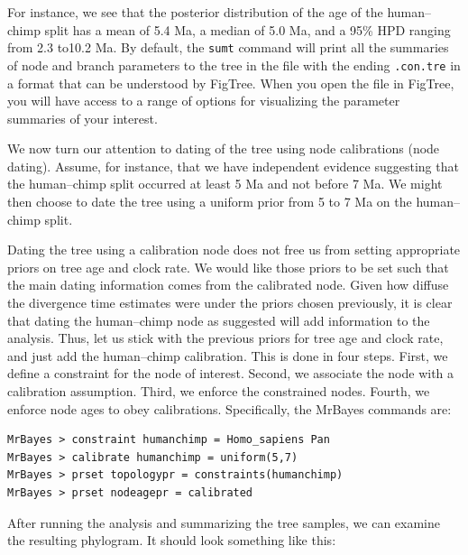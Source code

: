 \documentclass[12pt]{book}
\newcommand{\ttt}[1]{\texttt{#1} }
\begin{document}
For instance, we see that the posterior distribution of the age of the human--chimp split has a mean of 5.4 Ma, a
median of 5.0 Ma, and a 95\% HPD ranging from 2.3 to10.2 Ma. By default, the \ttt{sumt} command will print all
the summaries of node and branch parameters to the tree in the file with the ending \texttt{.con.tre} in a format
that can be understood by FigTree. When you open the file in FigTree, you will have access to a range of
options for visualizing the parameter summaries of your interest.

We now turn our attention to dating of the tree using node calibrations (node dating). Assume, for instance, that
we have independent evidence suggesting that the human--chimp split occurred at least 5 Ma and not before 7 Ma.
We might then choose to date the tree using a uniform prior from 5 to 7 Ma on the human--chimp split.

Dating the tree using a calibration node does not free us from setting appropriate priors on tree age and clock
rate. We would like those priors to be set such that the main dating information comes from the calibrated
node. Given how diffuse the divergence time estimates were under the priors chosen previously, it is clear
that dating the human--chimp node as suggested will add information to the analysis. Thus, let us stick with
the previous priors for tree age and clock rate, and just add the human--chimp calibration. This is done in
four steps. First, we define a constraint for the node of interest. Second, we associate the node with a
calibration assumption. Third, we enforce the constrained nodes. Fourth, we enforce node ages to obey
calibrations. Specifically, the MrBayes commands are:

\begin{singlespacing}
\begin{verbatim}
MrBayes > constraint humanchimp = Homo_sapiens Pan
MrBayes > calibrate humanchimp = uniform(5,7)
MrBayes > prset topologypr = constraints(humanchimp)
MrBayes > prset nodeagepr = calibrated
\end{verbatim}
\end{singlespacing}

After running the analysis and summarizing the tree samples, we can examine the resulting phylogram.
It should look something like this:
\end{document}
